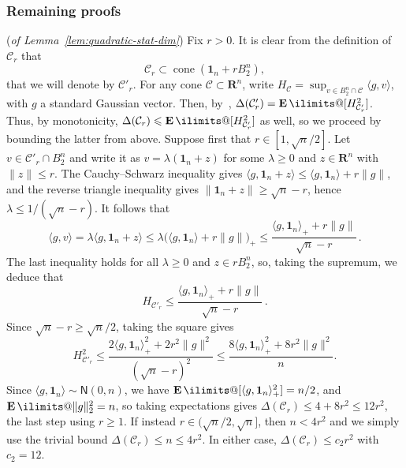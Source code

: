 \documentclass[11pt, letterpaper, hidelinks]{article}
\makeatletter
\renewcommand{\proofname}{\textit{\textbf{Proof}}}
\renewenvironment{proof}[1][\proofname]{\par\pushQED{\qed}\normalfont \topsep6\p@\@plus6\p@\relax\trivlist\item[\hskip\labelsep#1\@addpunct{}]\ignorespaces}{\popQED\endtrivlist\@endpefalse}
\newcommand{\R}{\mathbf R}
\newcommand{\1}{\mathbf 1}
\renewcommand{\leq}{\leqslant}
\renewcommand{\geq}{\geqslant}
\newcommand{\E}{\operatorname*{\mathbf{E}}\ilimits@}
\theoremstyle{plain}
\theoremstyle{definition}
\newcommand{\Normal}[2]{\mathsf{N}\left(#1, #2\right)}
\makeatother
\begin{document}
\subsubsection{Remaining proofs}
\label{sec:near-origin-remaining-proofs}
\begin{proof}(\emph{of Lemma~\ref{lem:quadratic-stat-dim}})
Fix $r>0$. It is clear from the definition of $\mathcal{C}_r$ that 
\[
\mathcal C_r
\subset
\operatorname{cone}\left(\1_n+rB_2^n\right),
\]
that we will denote by $\mathcal{C}'_r$.
For any cone $\mathcal{C}\subset \R^n$, write $H_{\mathcal{C}} = \sup_{v \in B_2^n \cap \mathcal{C}} \langle g, v\rangle$, with $g$ a standard Gaussian vector. Then, by~\cite[Prop.~3.1(5)]{amelunxen2014living}, $\Delta(\mathcal{C}'_r) = \E [H_{\mathcal{C}'_r}^2]$. Thus, by monotonicity, $\Delta(\mathcal{C}_r) \leq \E[ H_{\mathcal{C}'_r}^2]$ as well, so we proceed by bounding the latter from above.
Suppose first that $r\in[1,\sqrt n/2]$. Let $v \in \mathcal{C}'_r \cap B_2^n$ and write it as $v = \lambda (\1_n + z)$ for some $\lambda \geq 0$ and $z \in \R^n$ with $\|z\| \leq r$. The Cauchy--Schwarz inequality gives $\langle g,\1_n + z \rangle \leq \langle g,\1_n \rangle + r\|g\|$, and the reverse triangle inequality gives $\|\1_n+z\|\geq\sqrt{n} - r$, hence $\lambda \leq 1/(\sqrt{n} - r)$. It follows that
\[
\langle g, v\rangle
	= \lambda\langle g,\1_n + z\rangle
	\leq \lambda\big(\langle g,\1_n\rangle + r\|g\|\big)_+
	\leq \frac{\langle g,\1_n\rangle_+ + r\|g\|}{\sqrt{n} - r} \, .
\]
The last inequality holds for all $\lambda \geq 0$ and $z \in rB_2^n$, so, taking the supremum, we deduce that 
\begin{equation}
	H_{\mathcal{C}'_r} \leq \frac{\langle g,\1_n\rangle_+ + r\|g\|}{\sqrt{n} - r} \, .
\end{equation}
Since $\sqrt{n} - r \geq \sqrt{n} /2$, taking the square gives
\[
H_{\mathcal{C}'_r}^2
	\leq \frac{2\langle g, \1_n \rangle_+^2 + 2r^2 \|g\|^2}{(\sqrt n-r)^2}
	\leq \frac{8\langle g, \1_n \rangle_+^2 + 8r^2 \|g\|^2}{n}.
\]
Since $\langle g,\1_n\rangle\sim\Normal{0}{n}$, we have $\E[\langle g,\1_n\rangle_+^2]=n/2$, and $\E\|g\|_2^2=n$, so taking expectations gives $\Delta(\mathcal C_r)\leq4+8r^2\leq12r^2$, the last step using $r\geq 1$.
If instead $r\in(\sqrt n/2,\sqrt n]$, then $n < 4r^2$ and we simply use the trivial bound $\Delta(\mathcal{C}_r) \leq n \leq 4 r^2$. In either case, $\Delta(\mathcal C_r)\leq c_2 r^2$ with $c_2=12$.


\end{proof}
\end{document}
